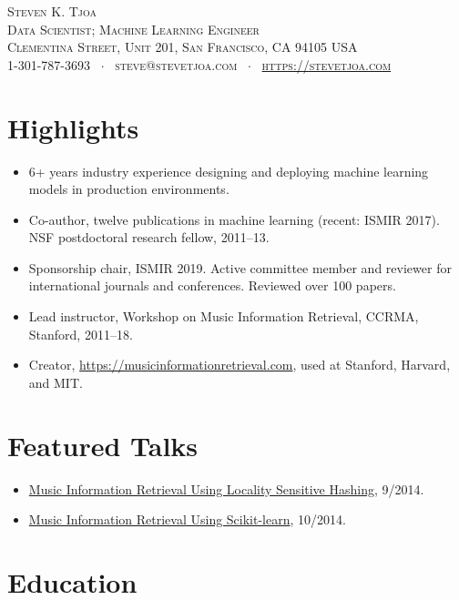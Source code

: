\documentclass[10pt,letterpaper]{article}
\newcommand{\namestyle}{\huge \scshape}
\newcommand{\addressstyle}{\color{addresscolor} \footnotesize \rmfamily \upshape}
\begin{document}
\begin{center}
    \namestyle Steven K. Tjoa \\[0.2em]
    \addressstyle Data Scientist; Machine Learning Engineer \\
    \addressstyle 19 Clementina Street, Unit 201, San Francisco, CA 94105 USA \\
    1-301-787-3693 \ $\cdot$ \ steve@stevetjoa.com \ $\cdot$ \ \url{https://stevetjoa.com}
\end{center}


\small
\section*{Highlights}

\begin{itemize}
    \item 6+ years industry experience designing and deploying machine learning models in production environments.
    \item Co-author, twelve publications in machine learning (recent: ISMIR 2017). NSF postdoctoral research fellow, 2011--13. 
    \item Sponsorship chair, ISMIR 2019. Active committee member and reviewer for international journals and conferences. Reviewed over 100 papers.
    \item Lead instructor, Workshop on Music Information Retrieval, CCRMA, Stanford, 2011--18.
    \item Creator, \url{https://musicinformationretrieval.com}, used at Stanford, Harvard, and MIT.
\end{itemize}


\section*{Featured Talks}

\begin{itemize}
    \item \href{https://youtu.be/SghMq1xBJPI}{Music Information Retrieval Using Locality Sensitive Hashing}, 9/2014. 
    \item \href{https://youtu.be/oGGVvTgHMHw}{Music Information Retrieval Using Scikit-learn}, 10/2014. 
\end{itemize}

\section*{Education}
\end{document}

